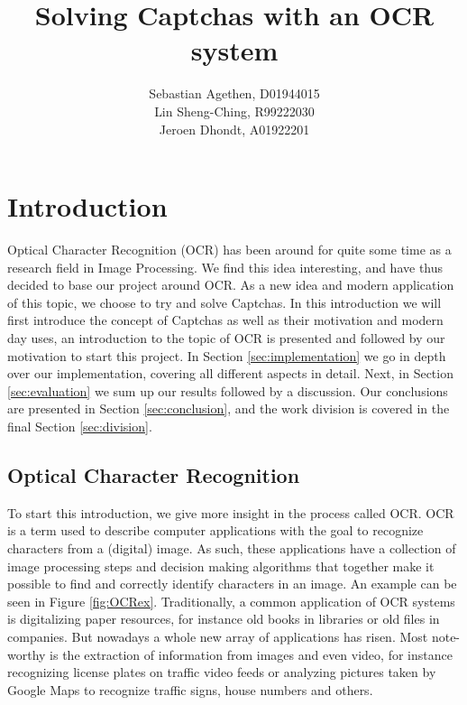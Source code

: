 \documentclass{article}
\begin{document}
\title{Solving Captchas with an OCR system}
\author{Sebastian Agethen, D01944015 \\ Lin Sheng-Ching, R99222030 \\ Jeroen Dhondt, A01922201 }

\onecolumn

\maketitle

\tableofcontents

\twocolumn

\section{Introduction}
\label{sec:intro}

Optical Character Recognition (OCR) has been around for quite some time as a research field in Image Processing. We find this idea interesting, and have thus decided to base our project around OCR. As a new idea and modern application of this topic, we choose to try and solve Captchas. In this introduction we will first introduce the concept of Captchas as well as their motivation and modern day uses, an introduction to the topic of OCR is presented and followed by our motivation to start this project. In Section \ref{sec:implementation} we go in depth over our implementation, covering all different aspects in detail. Next, in Section \ref{sec:evaluation} we sum up our results followed by a discussion. Our conclusions are presented in Section \ref{sec:conclusion}, and the work division is covered in the final Section \ref{sec:division}.

\subsection{Optical Character Recognition}
To start this introduction, we give more insight in the process called OCR. OCR is a term used to describe computer applications with the goal to recognize characters from a (digital) image. As such, these applications have a collection of image processing steps and decision making algorithms that together make it possible to find and correctly identify characters in an image. An example can be seen in Figure \ref{fig:OCRex}. Traditionally, a common application of OCR systems is digitalizing paper resources, for instance old books in libraries or old files in companies. But nowadays a whole new array of applications has risen. Most note-worthy is the extraction of information from images and even video, for instance recognizing license plates on traffic video feeds or analyzing pictures taken by Google Maps to recognize traffic signs, house numbers and others.
\end{document}
